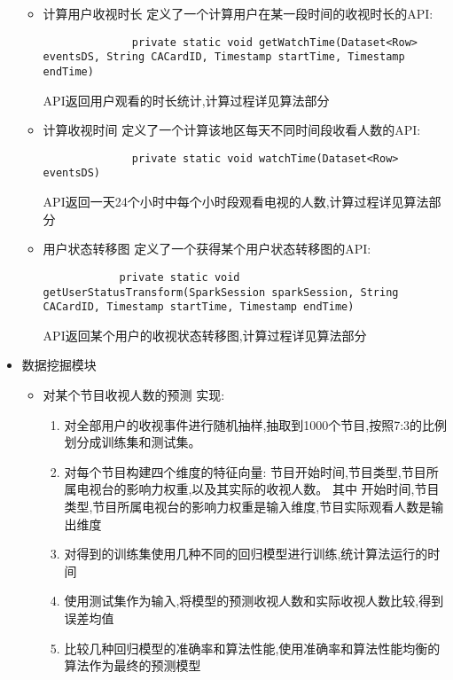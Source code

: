 \documentclass{hitreport}
\begin{document}
\begin{itemize}
\begin{itemize}
          \item 计算用户收视时长
                定义了一个计算用户在某一段时间的收视时长的API:
                \begin{lstlisting}
              private static void getWatchTime(Dataset<Row> eventsDS, String CACardID, Timestamp startTime, Timestamp endTime)
            \end{lstlisting}
                API返回用户观看的时长统计,计算过程详见算法部分
          \item 计算收视时间
                定义了一个计算该地区每天不同时间段收看人数的API:
                \begin{lstlisting}
              private static void watchTime(Dataset<Row> eventsDS)
            \end{lstlisting}
                API返回一天24个小时中每个小时段观看电视的人数,计算过程详见算法部分
          \item 用户状态转移图
                定义了一个获得某个用户状态转移图的API:
                \begin{lstlisting}
            private static void getUserStatusTransform(SparkSession sparkSession, String CACardID, Timestamp startTime, Timestamp endTime)
          \end{lstlisting}
                API返回某个用户的收视状态转移图,计算过程详见算法部分
        \end{itemize}
  \item 数据挖掘模块
        \begin{itemize}
          \item 对某个节目收视人数的预测
                实现:
                \begin{enumerate}
                  \item 对全部用户的收视事件进行随机抽样,抽取到1000个节目,按照7:3的比例划分成训练集和测试集。
                  \item 对每个节目构建四个维度的特征向量: 节目开始时间,节目类型,节目所属电视台的影响力权重,以及其实际的收视人数。
                        其中 开始时间,节目类型,节目所属电视台的影响力权重是输入维度,节目实际观看人数是输出维度
                  \item 对得到的训练集使用几种不同的回归模型进行训练,统计算法运行的时间
                  \item 使用测试集作为输入,将模型的预测收视人数和实际收视人数比较,得到误差均值
                  \item 比较几种回归模型的准确率和算法性能,使用准确率和算法性能均衡的算法作为最终的预测模型
                \end{enumerate}

\end{itemize}
\end{itemize}
\end{document}

